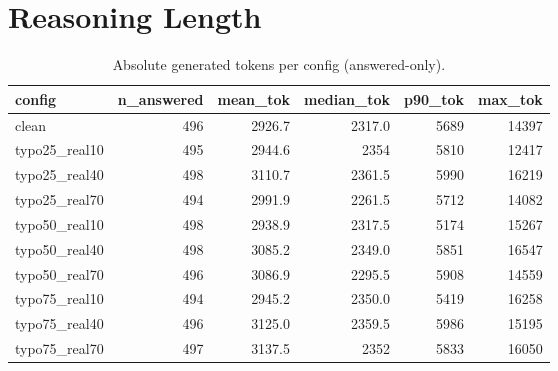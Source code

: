 \documentclass[11pt]{article}
\begin{document}
\section*{Reasoning Length}
\begin{table}[H]
\centering
\caption{Absolute generated tokens per config (answered-only).}
\small
\begin{adjustbox}{max width=\textwidth}
\begin{tabular}{lrrrrr}
\toprule
\textbf{config} & \textbf{n\_answered} & \textbf{mean\_tok} & \textbf{median\_tok} & \textbf{p90\_tok} & \textbf{max\_tok} \\
\midrule
clean & 496 & 2926.7 & 2317.0 & 5689 & 14397 \\
typo25\_real10 & 495 & 2944.6 & 2354 & 5810 & 12417 \\
typo25\_real40 & 498 & 3110.7 & 2361.5 & 5990 & 16219 \\
typo25\_real70 & 494 & 2991.9 & 2261.5 & 5712 & 14082 \\
typo50\_real10 & 498 & 2938.9 & 2317.5 & 5174 & 15267 \\
typo50\_real40 & 498 & 3085.2 & 2349.0 & 5851 & 16547 \\
typo50\_real70 & 496 & 3086.9 & 2295.5 & 5908 & 14559 \\
typo75\_real10 & 494 & 2945.2 & 2350.0 & 5419 & 16258 \\
typo75\_real40 & 496 & 3125.0 & 2359.5 & 5986 & 15195 \\
typo75\_real70 & 497 & 3137.5 & 2352 & 5833 & 16050 \\
\bottomrule
\end{tabular}
\end{adjustbox}
\end{table}
\end{document}
